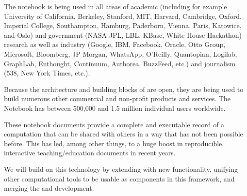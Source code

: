 The \Jupyter notebook is being used in all areas of academic
(including for example University of California, Berkeley, Stanford,
MIT, Harvard, Cambridge, Oxford, Imperial College, Southampton,
Hamburg, Paderborn, Vienna, Paris, Katowice, and Oslo) and government
(NASA JPL, LBL, KBase, White House Hackathon) research as well as
industry (Google, IBM, Facebook, Oracle, Otto Group, Microsoft,
Bloomberg, JP Morgan, WhatsApp, O’Reilly, Quantopian, Logilab,
GraphLab, Enthought, Continuum, Authorea, BuzzFeed, etc.)  and
journalism (538, New York Times, etc.). 

Because the architecture and building blocks of \Jupyter are open,
they are being used to build numerous other commercial and non-profit
products and services. The \Jupyter Notebook has between 500,000 and
1.5 million individual users worldwide.

These notebook documents provide a complete and executable record of a
computation that can be shared with others in a way that has not been
possible before. This has led, among other things, to a huge boost in
reproducible, interactive teaching/education documents in recent
years.

We will build on this technology by extending \Jupyter with new
functionality, unifying other computational tools to be usable as
components in this framework, and merging the \Sage and \Jupyter
development.




